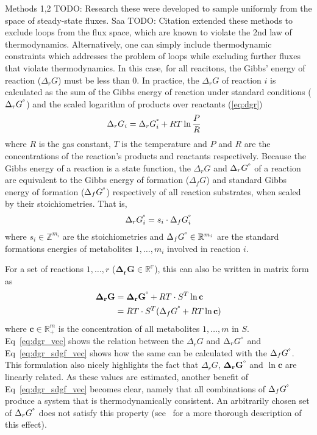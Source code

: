 \documentclass[10pt,letterpaper]{article}
\newcommand{\dgf}{\Delta_fG}
\newcommand{\sdgf}{\Delta_fG^{\degree}}
\newcommand{\dgr}{\Delta_rG}
\newcommand{\sdgr}{\Delta_rG^{\degree}}
\newcommand{\bdgr}{\mathbf{\dgr}}
\newcommand{\bsdgr}{\mathbf{\sdgr}}
\begin{document}
Methods 1,2 {TODO: Research these} were developed to sample uniformly from the space of steady-state fluxes.
Saa {TODO: Citation} extended these methods to exclude loops from the flux space, which are known to violate the 2nd law of thermodynamics.
Alternatively, one can simply include thermodynamic constraints which addresses the problem of loops while excluding further fluxes that violate thermodynamics.
In this case, for all reacitons, the Gibbs' energy of reaction ($\dgr$) must be less than 0.
In practice, the $\dgr$ of reaction $i$ is calculated as the sum of the Gibbs energy of reaction under standard conditions ($\sdgr$) and the scaled logarithm of products over reactants (\ref{eq:dgr})
\begin{align}
    \dgr_i &= \sdgr_i + RT\ln \frac{P}{R} \label{eq:dgr}
\end{align}
where $R$ is the gas constant, $T$ is the temperature and $P$ and $R$ are the concentrations of the reaction's products and reactants respectively.
Because the Gibbs energy of a reaction is a state function, the $\dgr$ and $\sdgr$ of a reaction are equivalent to the Gibbs energy of formation ($\dgf$) and standard Gibbs energy of formation ($\sdgf$) respectively of all reaction substrates, when scaled by their stoichiometries.
That is,
\[
    \sdgr_i = s_i \cdot \sdgf_i
\]
where $s_i \in \mathbb{Z}^{m_i}$ are the stoichiometries and $\sdgf \in \mathbb{R}^{m_i}$ are the standard formations energies of metabolites $1,\dots,m_i$ involved in reaction $i$.

For a set of reactions $1,\dots,r$ ($\bdgr \in \mathbb{R^r}$), this can also be written in matrix form as
\begin{align}
        \bdgr &= \bsdgr + RT \cdot S^{T}\ln{\mathbf{c}} \label{eq:dgr_vec}\\
              &= RT \cdot S^T (\sdgf + RT \ln{\mathbf{c}}) \label{eq:dgr_sdgf_vec}
\end{align}
where $\mathbf{c} \in \mathbb{R}_{+}^m$ is the concentration of all metabolites $1,\dots,m$ in $S$.
Eq~\ref{eq:dgr_vec} shows the relation between the $\dgr$ and $\sdgr$ and Eq~\ref{eq:dgr_sdgf_vec} shows how the same can be calculated with the $\sdgf$.
This formulation also nicely highlights the fact that $\dgr$, $\bsdgr$ and $\ln{\mathbf{c}}$ are linearly related. %
As these values are estimated, another benefit of Eq~\ref{eq:dgr_sdgf_vec} becomes clear, namely that all combinations of $\sdgf$ produce a system that is thermodynamically consistent.
An arbitrarily chosen set of $\sdgr$ does not satisfy this property (see~\cite{noor_2013_equilibrator} for a more thorough description of this effect).
\end{document}
